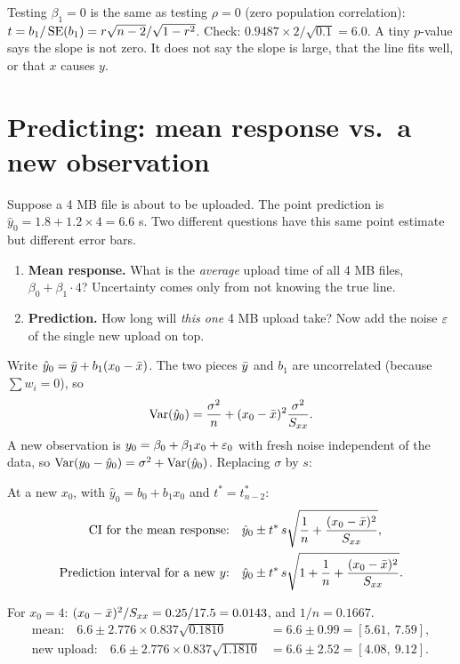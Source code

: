 \begin{trapbox}
Testing $\beta_1 = 0$ is the same as testing $\rho = 0$ (zero population
correlation): $t = b_1/\operatorname{SE}(b_1) = r\sqrt{n-2}/\sqrt{1-r^2}$. Check:
$0.9487\times 2/\sqrt{0.1} = 6.0$. A tiny $p$-value says the slope is not zero.
It does not say the slope is large, that the line fits well, or that $x$
causes $y$.
\end{trapbox}

\section{Predicting: mean response vs.\ a new observation}
\label{sec:slr-predict}

Suppose a 4 MB file is about to be uploaded. The point prediction is
$\hat y_0 = 1.8 + 1.2\times 4 = 6.6$ s. Two different questions have this
same point estimate but different error bars.

\begin{enumerate}
  \item \textbf{Mean response.} What is the \emph{average} upload time of all
  4 MB files, $\beta_0+\beta_1\cdot 4$? Uncertainty comes only from not
  knowing the true line.
  \item \textbf{Prediction.} How long will \emph{this one} 4 MB upload take?
  Now add the noise $\varepsilon$ of the single new upload on top.
\end{enumerate}

Write $\hat y_0 = \bar{y} + b_1(x_0-\bar{x})$. The two pieces $\bar{y}$ and $b_1$ are
uncorrelated (because $\sum w_i = 0$), so
\[
  \operatorname{Var}(\hat y_0) = \frac{\sigma^2}{n} + (x_0-\bar{x})^2\frac{\sigma^2}{S_{xx}} .
\]
A new observation is $y_0 = \beta_0+\beta_1x_0+\varepsilon_0$ with fresh noise
independent of the data, so $\operatorname{Var}(y_0 - \hat y_0) = \sigma^2 + \operatorname{Var}(\hat y_0)$.
Replacing $\sigma$ by $s$:

\begin{definition}
At a new $x_0$, with $\hat y_0 = b_0 + b_1x_0$ and $t^* = t^*_{n-2}$:
\begin{align*}
  \text{CI for the mean response:}\quad &
  \hat y_0 \pm t^*\, s\sqrt{\frac1n + \frac{(x_0-\bar{x})^2}{S_{xx}}},\\
  \text{Prediction interval for a new $y$:}\quad &
  \hat y_0 \pm t^*\, s\sqrt{1 + \frac1n + \frac{(x_0-\bar{x})^2}{S_{xx}}}.
\end{align*}
\end{definition}

For $x_0=4$: $(x_0-\bar{x})^2/S_{xx} = 0.25/17.5 = 0.0143$, and $1/n = 0.1667$.
\begin{align*}
  \text{mean:}\quad 6.6 \pm 2.776\times 0.837\sqrt{0.1810}
     &= 6.6 \pm 0.99 = [5.61,\ 7.59],\\
  \text{new upload:}\quad 6.6 \pm 2.776\times 0.837\sqrt{1.1810}
     &= 6.6 \pm 2.52 = [4.08,\ 9.12].
\end{align*}

